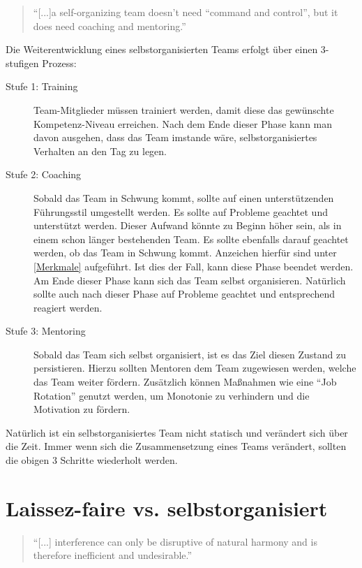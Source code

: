 \begin{quote}
"`[...]a self-organizing team doesn't need "`command and control"', but it does need coaching and mentoring."'\cite{Mittal2013}
\end{quote}

Die Weiterentwicklung eines selbstorganisierten Teams erfolgt über einen 3-stufigen Prozess:\cite{Mittal2013}
\begin{description}
\item[Stufe 1: Training ]Team-Mitglieder müssen trainiert werden, damit diese das gewünschte Kompetenz-Niveau erreichen. Nach dem Ende dieser Phase kann man davon ausgehen, dass das Team imstande wäre, selbstorganisiertes Verhalten an den Tag zu legen.

\item[Stufe 2: Coaching ]Sobald das Team in Schwung kommt, sollte auf einen unterstützenden Führungsstil umgestellt werden. Es sollte auf Probleme geachtet und unterstützt werden. Dieser Aufwand könnte zu Beginn höher sein, als in einem schon länger bestehenden Team. Es sollte ebenfalls darauf geachtet werden, ob das Team in Schwung kommt. Anzeichen hierfür sind unter  \ref{Merkmale} aufgeführt. Ist dies der Fall, kann diese Phase beendet werden. Am Ende dieser Phase kann sich das Team selbst organisieren. Natürlich sollte auch nach dieser Phase auf Probleme geachtet und entsprechend reagiert werden.

\item[Stufe 3: Mentoring ] Sobald das Team sich selbst organisiert, ist es das Ziel diesen Zustand zu persistieren. Hierzu sollten Mentoren dem Team zugewiesen werden, welche das Team weiter fördern. Zusätzlich können Maßnahmen wie eine "`Job Rotation"' genutzt werden, um Monotonie zu verhindern und die Motivation zu fördern.

\end{description}

Natürlich ist ein selbstorganisiertes Team nicht statisch und verändert sich über die Zeit. Immer wenn sich die Zusammensetzung eines Teams verändert, sollten die obigen 3 Schritte wiederholt werden.

\section{Laissez-faire vs. selbstorganisiert}
\begin{quote}
"`[...] interference can only be disruptive of natural harmony and is therefore inefficient and undesirable."'\cite{Gaspard2004}
\end{quote}
\newcommand{\xmark}{\ding{55}}%

